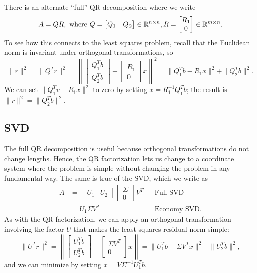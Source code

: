 \documentclass[12pt, leqno]{article}
\begin{document}
There is an alternate ``full'' QR decomposition where we write
\[
A = QR, \mbox{ where }
Q = \begin{bmatrix} Q_1 & Q_2 \end{bmatrix} \in \mathbb{R}^{n \times n},
R = \begin{bmatrix} R_{1} \\ 0 \end{bmatrix} \in \mathbb{R}^{m \times n}.
\]
To see how this connects to the least squares problem, recall
that the Euclidean norm is invariant under orthogonal transformations,
so
\[
  \|r\|^2 = \|Q^T r\|^2 = \left\| \begin{bmatrix} Q_1^T b \\ Q_2^T
    b \end{bmatrix} - \begin{bmatrix} R_1 \\ 0 \end{bmatrix} x
  \right\|^2 = \|Q_1^T b-R_1x\|^2 + \|Q_2^T b\|^2.
\]
We can set $\|Q_1^T v-R_1 x\|^2$ to zero by
setting $x = R_1^{-1} Q_1^T b$; the result is
$\|r\|^2 = \|Q_2^T b\|^2$.

\subsection*{SVD}

The full QR decomposition is useful because orthogonal transformations
do not change lengths.  Hence, the QR factorization lets us change
to a coordinate system where the problem is simple without changing
the problem in any fundamental way.  The same is true of the SVD,
which we write as
\begin{align*}
A &=
\begin{bmatrix} U_1 & U_2 \end{bmatrix}
\begin{bmatrix} \Sigma \\ 0 \end{bmatrix}
V^T & & \mbox{Full SVD} \\
&= U_1 \Sigma V^T & & \mbox{Economy SVD}.
\end{align*}
As with the QR factorization, we can apply an orthogonal
transformation involving the factor $U$ that makes the
least squares residual norm simple:
\[
\|U^T r\|^2 =
\left\| \begin{bmatrix} U_1^T b \\ U_2^T b \end{bmatrix} -
\begin{bmatrix} \Sigma V^T \\ 0 \end{bmatrix} x
\right\| =
\|U_1^T b - \Sigma V^T x\|^2 + \|U_2^T b\|^2,
\]
and we can minimize by setting $x = V \Sigma^{-1} U_1^T b$.
\end{document}
